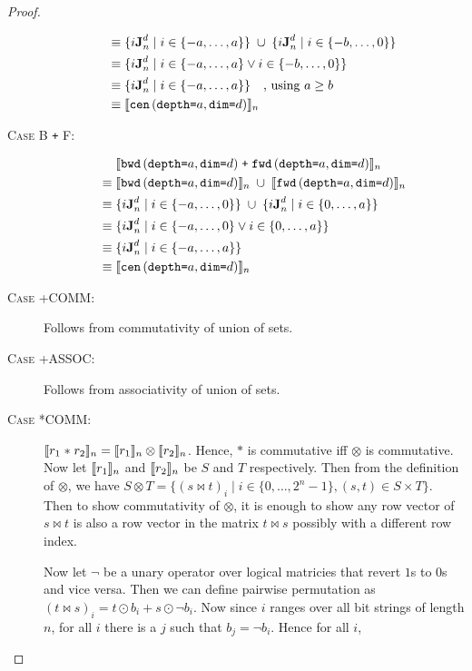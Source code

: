 \begin{proof}
\begin{description}
\begin{align*}
      \equiv & \; \{i\singleEntry{d}{n} \mid i \in \{-a, \ldots, a\} \} \; \cup \;
                  \{i\singleEntry{d}{n} \mid i \in \{-b, \ldots, 0\} \} \\
      \equiv & \; \{i\singleEntry{d}{n} \mid i \in \{-a, \ldots, a\}
                    \vee i \in \{-b, \ldots, 0\} \} \\
      \equiv & \; \{i\singleEntry{d}{n} \mid i \in \{-a, \ldots, a\} \} \quad \text{, using }a \geq b \\
      \equiv & \; \interp{\stenCenS{a}{d}}_n \\
    \end{align*}
  \item[\textsc{Case B \texttt{+} F}:]
    \begin{align*}
      & \; \interp{\stenBwdS{a}{d} \; \texttt{+} \; \stenFwdS{a}{d}}_{n} \\
      \equiv & \; \interp{\stenBwdS{a}{d}}_{n} \; \cup \; \interp{\stenFwdS{a}{d}}_{n} \\
      \equiv & \; \{i\singleEntry{d}{n} \mid i \in \{-a, \ldots, 0\} \} \; \cup \;
                  \{i\singleEntry{d}{n} \mid i \in \{0, \ldots, a\} \} \\
      \equiv & \; \{i\singleEntry{d}{n} \mid i \in \{-a, \ldots, 0\}
                    \vee i \in \{0, \ldots, a\} \} \\
      \equiv & \; \{i\singleEntry{d}{n} \mid i \in \{-a, \ldots, a\} \} \\
      \equiv & \; \interp{\stenCenS{a}{d}}_n \\
    \end{align*}
  \item[\textsc{Case +COMM}:] Follows from commutativity of union of sets.
  \item[\textsc{Case +ASSOC}:] Follows from associativity of union of sets.
  \item[\textsc{Case *COMM}:] $\interp{r_1 \; \texttt{$\ast$} \; r_2}_n =
    \interp{r_1}_n \otimes \interp{r_2}_n$. Hence, $\texttt{$\ast$}$ is
    commutative iff $\otimes$ is commutative. Now let $\interp{r_1}_n$ and
    $\interp{r_2}_n$ be $S$ and $T$ respectively. Then from the definition of
    $\otimes$, we have $S \otimes T = \{ (s \bowtie t)_i \mid i \in
    \{ 0, \ldots, 2^n-1 \}, (s,t) \in S \times T \}$. Then to show
    commutativity of $\otimes$, it is enough to show any row vector of $s
    \bowtie t$ is also a row vector in the matrix $t \bowtie s$ possibly with a
    different row index.

    Now let $\neg$ be a unary operator over logical matricies that revert $1$s
    to $0$s and vice versa. Then we can define pairwise permutation as
    $(t \bowtie s)_i = t \odot b_i + s \odot \neg b_i$. Now since $i$ ranges
    over all bit strings of length $n$, for all $i$ there is a $j$ such that
    $b_j = \neg b_i$. Hence for all $i$,


\end{description}
\end{proof}
